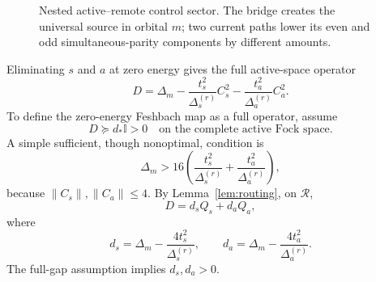 \documentclass[11pt]{article}
\theoremstyle{definition}
\theoremstyle{remark}
\newcommand{\Id}{\mathbb I}
\newcommand{\cR}{\mathcal R}
\newcommand{\norm}[1]{\lVert #1\rVert}
\begin{document}
\begin{figure}[t]
\centering
{}
\caption{Nested active--remote control sector.  The bridge creates the universal source in orbital $m$; two current paths lower its even and odd simultaneous-parity components by different amounts.}
\label{fig:control-chain}
\end{figure}

Eliminating $s$ and $a$ at zero energy gives the full active-space operator
\begin{equation}
 D=\Delta_m-\frac{t_s^2}{\Delta_s^{(r)}}C_s^2
 -\frac{t_a^2}{\Delta_a^{(r)}}C_a^2.
 \label{eq:D-full}
\end{equation}
To define the zero-energy Feshbach map as a full operator, assume
\begin{equation}
 \boxed{D\succeq d_*\Id>0\quad\text{on the complete active Fock space}.}
 \label{eq:D-gap}
\end{equation}
A simple sufficient, though nonoptimal, condition is
\begin{equation}
 \Delta_m>16\left(\frac{t_s^2}{\Delta_s^{(r)}}+\frac{t_a^2}{\Delta_a^{(r)}}\right),
 \label{eq:D-sufficient}
\end{equation}
because $\norm{C_s},\norm{C_a}\le4$.  By Lemma~\ref{lem:routing}, on $\cR$,
\begin{equation}
 D=d_sQ_s+d_aQ_a,
 \label{eq:D-parity}
\end{equation}
where
\begin{equation}
 d_s=\Delta_m-\frac{4t_s^2}{\Delta_s^{(r)}},
 \qquad
 d_a=\Delta_m-\frac{4t_a^2}{\Delta_a^{(r)}}.
 \label{eq:dsa}
\end{equation}
The full-gap assumption implies $d_s,d_a>0$.
\end{document}
